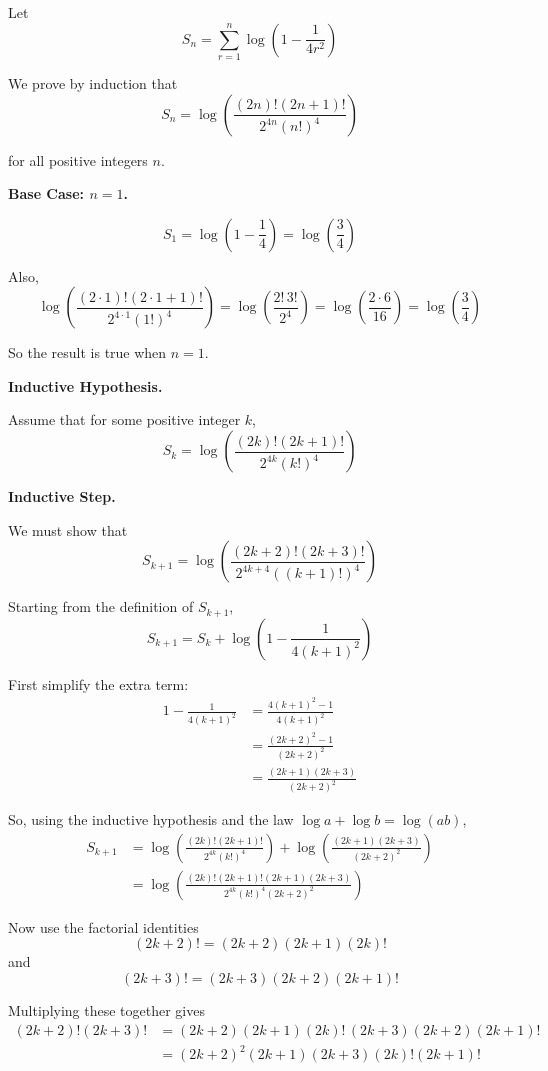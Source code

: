 \documentclass[leqno]{article}
\begin{document}
\begin{enumerate}[
  label=\textbf{\arabic*.},
  leftmargin=*,
  topsep=0pt,
  partopsep=0pt,
  parsep=0pt
]
\begin{tcolorbox}[colback=white, colframe=scarlet, title={\textbf{Solution}}, breakable, grow to left by=6mm, grow to right by=10mm]
Let
\[
S_n=\sum_{r=1}^{n}\log\left(1-\frac{1}{4r^2}\right)
\]

We prove by induction that
\[
S_n=\log\left(\frac{(2n)!(2n+1)!}{2^{4n}(n!)^4}\right)
\]

for all positive integers \(n\).

\textbf{Base Case: \(n=1\).}

\[
S_1=\log\left(1-\frac14\right)=\log\left(\frac34\right)
\]

Also,
\[
\log\left(\frac{(2\cdot1)!(2\cdot1+1)!}{2^{4\cdot1}(1!)^4}\right)
=\log\left(\frac{2!\,3!}{2^4}\right)
=\log\left(\frac{2\cdot6}{16}\right)
=\log\left(\frac34\right)
\]

So the result is true when \(n=1\).

\textbf{Inductive Hypothesis.}

Assume that for some positive integer \(k\),
\[
S_k=\log\left(\frac{(2k)!(2k+1)!}{2^{4k}(k!)^4}\right)
\]

\textbf{Inductive Step.}

We must show that
\[
S_{k+1}=\log\left(\frac{(2k+2)!(2k+3)!}{2^{4k+4}((k+1)!)^4}\right)
\]

Starting from the definition of \(S_{k+1}\),
\[
S_{k+1}=S_k+\log\left(1-\frac{1}{4(k+1)^2}\right)
\]

First simplify the extra term:
\begin{align*}
1-\frac{1}{4(k+1)^2}
&=\frac{4(k+1)^2-1}{4(k+1)^2} \\
&=\frac{(2k+2)^2-1}{(2k+2)^2} \\
&=\frac{(2k+1)(2k+3)}{(2k+2)^2}
\end{align*}

So, using the inductive hypothesis and the law \(\log a+\log b=\log(ab)\),
\begin{align*}
S_{k+1}
&=\log\left(\frac{(2k)!(2k+1)!}{2^{4k}(k!)^4}\right)
+\log\left(\frac{(2k+1)(2k+3)}{(2k+2)^2}\right) \\
&=\log\left(\frac{(2k)!(2k+1)!(2k+1)(2k+3)}{2^{4k}(k!)^4(2k+2)^2}\right)
\end{align*}

Now use the factorial identities
\[
(2k+2)!=(2k+2)(2k+1)(2k)!
\]
and
\[
(2k+3)!=(2k+3)(2k+2)(2k+1)!
\]

Multiplying these together gives
\begin{align*}
(2k+2)!(2k+3)!
&=(2k+2)(2k+1)(2k)!\,(2k+3)(2k+2)(2k+1)! \\
&=(2k+2)^2(2k+1)(2k+3)(2k)!(2k+1)!
\end{align*}


\end{tcolorbox}
\end{enumerate}
\end{document}
